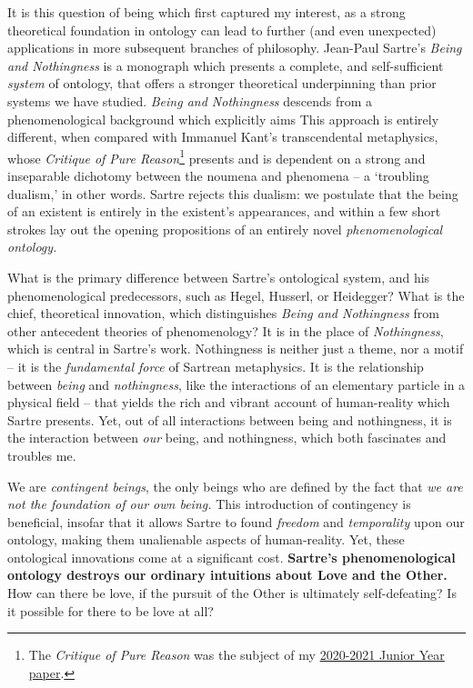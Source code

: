 It is this question of being which first captured my interest, as a strong theoretical foundation in ontology can lead to further (and even unexpected) applications in more subsequent branches of philosophy. Jean-Paul Sartre's \emph{Being and Nothingness} is a monograph which presents a complete, and self-sufficient \emph{system} of ontology, that offers a stronger theoretical underpinning than prior systems we have studied. \emph{Being and Nothingness} descends from a phenomenological background which explicitly aims  This approach is entirely different, when compared with Immanuel Kant's transcendental metaphysics, whose \emph{Critique of Pure Reason}\footnote{The \emph{Critique of Pure Reason} was the subject of my \href{https://github.com/ShenZhouHong/kant-metaphysics}{2020-2021 Junior Year paper}.} presents and is dependent on a strong and inseparable dichotomy between the noumena and phenomena -- a \enquote*{troubling dualism,} in other words. Sartre rejects this dualism: we postulate that the being of an existent is entirely in the existent's appearances, and within a few short strokes lay out the opening propositions of an entirely novel \emph{phenomenological ontology.}


What is the primary difference between Sartre's ontological system, and his phenomenological predecessors, such as Hegel, Husserl, or Heidegger? What is the chief, theoretical innovation, which distinguishes \emph{Being and Nothingness} from other antecedent theories of phenomenology? It is in the place of \emph{Nothingness}, which is central in Sartre's work. Nothingness is neither just a theme, nor a motif -- it is the \emph{fundamental force} of Sartrean metaphysics. It is the relationship between \emph{being} and \emph{nothingness}, like the interactions of an elementary particle in a physical field -- that yields the rich and vibrant account of human-reality which Sartre presents. Yet, out of all interactions between being and nothingness, it is the interaction between \emph{our} being, and nothingness, which both fascinates and troubles me. 

We are \emph{contingent beings}, the only beings who are defined by the fact that \emph{we are not the foundation of our own being.} This introduction of contingency is beneficial, insofar that it allows Sartre to found \emph{freedom} and \emph{temporality} upon our ontology, making them unalienable aspects of human-reality. Yet, these ontological innovations come at a significant cost.  \textbf{Sartre's phenomenological ontology destroys our ordinary intuitions about Love and the Other.} How can there be love, if the pursuit of the Other is ultimately self-defeating? Is it possible for there to be love at all?


